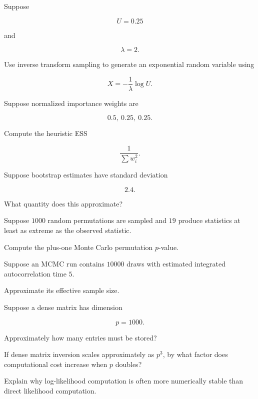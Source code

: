\begin{exercise}[2]
Suppose

\[
U=0.25
\]

and

\[
\lambda=2.
\]

Use inverse transform sampling to generate an exponential random variable
using

\[
X=-\frac1\lambda\log U.
\]
\end{exercise}

\begin{exercise}[2]
Suppose normalized importance weights are

\[
0.5,\ 0.25,\ 0.25.
\]

Compute the heuristic ESS

\[
\frac1{\sum w_i^2}.
\]
\end{exercise}

\begin{exercise}[2]
Suppose bootstrap estimates have standard deviation

\[
2.4.
\]

What quantity does this approximate?
\end{exercise}

\begin{exercise}[2]
Suppose \(1000\) random permutations are sampled and \(19\) produce
statistics at least as extreme as the observed statistic.

Compute the plus-one Monte Carlo permutation \(p\)-value.
\end{exercise}

\begin{exercise}[2]
Suppose an MCMC run contains \(10000\) draws with estimated integrated
autocorrelation time \(5\).

Approximate its effective sample size.
\end{exercise}

\begin{exercise}[2]
Suppose a dense matrix has dimension

\[
p=1000.
\]

Approximately how many entries must be stored?
\end{exercise}

\begin{exercise}[2]
If dense matrix inversion scales approximately as \(p^3\), by what factor
does computational cost increase when \(p\) doubles?
\end{exercise}

\begin{exercise}[3]
Explain why log-likelihood computation is often more numerically stable
than direct likelihood computation.
\end{exercise}

